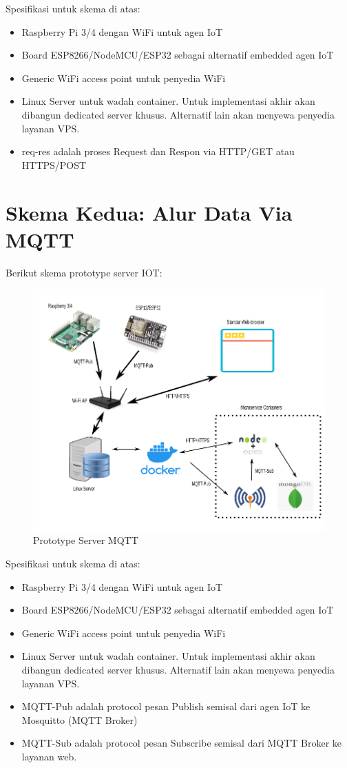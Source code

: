 \documentclass[12pt,]{article}
\begin{document}
	Spesifikasi untuk skema di atas:
	\begin{itemize}
		\item Raspberry Pi 3/4 dengan WiFi untuk agen IoT
		\item Board ESP8266/NodeMCU/ESP32 sebagai alternatif embedded agen IoT 
		\item Generic WiFi access point untuk penyedia WiFi
		\item Linux Server untuk wadah container.
		Untuk implementasi akhir akan dibangun dedicated server khusus.
		Alternatif lain akan menyewa penyedia layanan VPS.
		\item req-res adalah proses Request dan Respon via HTTP/GET atau HTTPS/POST
	\end{itemize}

	\newpage
	\section{Skema Kedua: Alur Data Via MQTT}
	
	Berikut skema prototype server IOT:
	
	\begin{figure}[!ht]
		\centering
		\includegraphics[width=500pt]{images/preview-mqtt}
		\caption{Prototype Server MQTT}
	\end{figure}
	
	Spesifikasi untuk skema di atas:
	\begin{itemize}
		\item Raspberry Pi 3/4 dengan WiFi untuk agen IoT
		\item Board ESP8266/NodeMCU/ESP32 sebagai alternatif embedded agen IoT 
		\item Generic WiFi access point untuk penyedia WiFi
		\item Linux Server untuk wadah container.
		Untuk implementasi akhir akan dibangun dedicated server khusus.
		Alternatif lain akan menyewa penyedia layanan VPS.
		\item MQTT-Pub adalah protocol pesan Publish semisal dari agen IoT ke Mosquitto (MQTT Broker)
		\item MQTT-Sub adalah protocol pesan Subscribe semisal dari MQTT Broker ke layanan web.
	\end{itemize}
\end{document}
